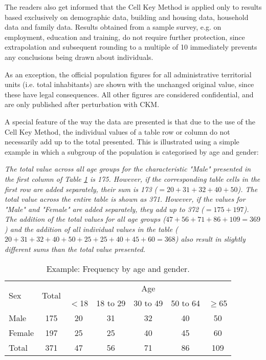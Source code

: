 The readers also get informed that the Cell Key Method is applied only to results based exclusively on demographic data, building and housing data, household data and family data. Results obtained from a sample survey, e.g. on employment, education and training, do not require further protection, since extrapolation and subsequent rounding to a multiple of 10 immediately prevents any conclusions being drawn about individuals. 

As an exception, the official population figures for all administrative territorial units (i.e. total inhabitants) are shown with the unchanged original value, since these have legal consequences. All other figures are considered confidential, and are only published after perturbation with CKM.

A special feature of the way the data are presented is that due to the use of the Cell Key Method, the individual values of a table row or column do not necessarily add up to the total presented.
This is illustrated using a simple example in which a subgroup of the population is categorised by age and gender:

\begin{table}[!th]
\begin{mdframed}

\textit{The total value across all age groups for the characteristic "Male" presented in the first column of Table \ref{table:comm_destatis} is 175. However, if the corresponding table cells in the first row are added separately, their sum is 173 ($=20+31+32+40+50$). The total value across the entire table is shown as 371. However, if the values for "Male" and "Female" are added separately, they add up to 372 ($= 175 + 197$). The addition of the total values for all age groups ($47 + 56 + 71 + 86 + 109 = 369$) and the addition of all individual values in the table ($20 + 31 + 32 + 40 + 50 + 25 + 25 + 40 + 45 + 60 = 368$) also result in slightly different sums than the total value presented.
}

\hfill \break
\centering
\begin{adjustbox}{max height=8cm,max width=\linewidth,keepaspectratio}
\begin{tabular}{|l|c|c|c|c|c|c|}

\hline
\multirow{2}{*}{Sex} & \multirow{2}{*}{Total} & \multicolumn{5}{c|}{Age}\\
\cline{3-7}
 &  & $<$18 & 18 to 29 & 30 to 49 & 50 to 64& $\geq$65\\
\hhline{|=|=|=|=|=|=|=|}
Male & 175 & 20 & 31 & 32 & 40 & 50 \\
\hline
Female & 197 & 25 & 25 & 40 & 45 & 60 \\
\hline
Total & 371 & 47 & 56 & 71 & 86 & 109 \\
\hline
\end{tabular}
\end{adjustbox}
\caption{Example: Frequency by age and gender.}
\label{table:comm_destatis}


\end{mdframed}
\end{table}

